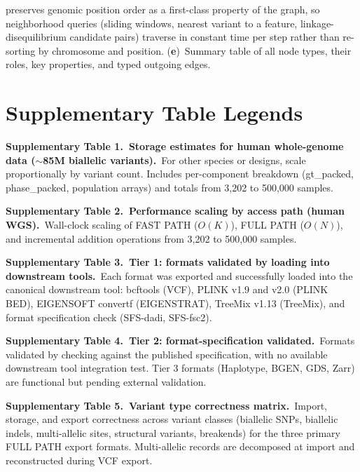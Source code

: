 \documentclass[11pt,a4paper]{article}
\begin{document}
preserves genomic position order as a first-class property of the graph, so neighborhood queries (sliding windows, nearest variant to a feature, linkage-disequilibrium candidate pairs) traverse in constant time per step rather than re-sorting by chromosome and position. (\textbf{e})~Summary table of all node types, their roles, key properties, and typed outgoing edges.

\vspace{0.8em}

\newpage

\section{Supplementary Table Legends}

\noindent\textbf{Supplementary Table 1.~Storage estimates for human whole-genome data ($\sim$85M biallelic variants).}~For other species or designs, scale proportionally by variant count. Includes per-component breakdown (gt\_packed, phase\_packed, population arrays) and totals from 3,202 to 500,000 samples.

\vspace{0.8em}

\noindent\textbf{Supplementary Table 2.~Performance scaling by access path (human WGS).}~Wall-clock scaling of FAST PATH ($O(K)$), FULL PATH ($O(N)$), and incremental addition operations from 3,202 to 500,000 samples.

\vspace{0.8em}

\noindent\textbf{Supplementary Table 3.~Tier 1: formats validated by loading into downstream tools.}~Each format was exported and successfully loaded into the canonical downstream tool: bcftools (VCF), PLINK v1.9 and v2.0 (PLINK BED), EIGENSOFT convertf (EIGENSTRAT), TreeMix v1.13 (TreeMix), and format specification check (SFS-dadi, SFS-fsc2).

\vspace{0.8em}

\noindent\textbf{Supplementary Table 4.~Tier 2: format-specification validated.}~Formats validated by checking against the published specification, with no available downstream tool integration test. Tier 3 formats (Haplotype, BGEN, GDS, Zarr) are functional but pending external validation.

\vspace{0.8em}

\noindent\textbf{Supplementary Table 5.~Variant type correctness matrix.}~Import, storage, and export correctness across variant classes (biallelic SNPs, biallelic indels, multi-allelic sites, structural variants, breakends) for the three primary FULL PATH export formats. Multi-allelic records are decomposed at import and reconstructed during VCF export.
\end{document}
